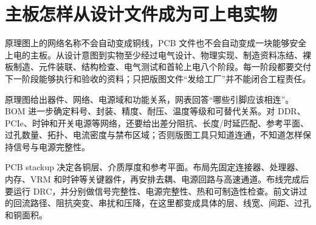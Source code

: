 \section{主板怎样从设计文件成为可上电实物}

原理图上的网络名称不会自动变成铜线，PCB 文件也不会自动变成一块能够安全上电的主板。从设计意图到实物至少经过电气设计、物理实现、制造资料冻结、裸板制造、元件装联、结构检查、电气测试和首轮上电八个阶段。每一阶段都要交付下一阶段能够执行和验收的资料；只把版图文件“发给工厂”并不能闭合工程责任。


原理图给出器件、网络、电源域和功能关系，网表回答“哪些引脚应该相连”。BOM 进一步确定料号、封装、精度、耐压、温度等级和可替代关系。对 DDR、PCIe、时钟和开关电源等网络，还要给出差分阻抗、长度/时延匹配、参考平面、过孔数量、拓扑、电流密度与禁布区域；否则版图工具只知道连通，不知道怎样保持信号与电源完整性。

PCB stackup 决定各铜层、介质厚度和参考平面。布局先固定连接器、处理器、内存、VRM 和时钟等关键器件，再安排去耦、电源回路与高速通道。布线完成后要运行 DRC，并分别做信号完整性、电源完整性、热和可制造性检查。前文讲过的回流路径、阻抗突变、串扰和压降，在这里都变成具体的层、线宽、间距、过孔和铜面积。

